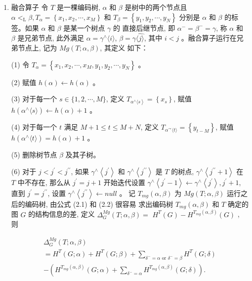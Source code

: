 \documentclass[a4paper]{apa6}
\begin{document}
\begin{enumerate}
\item 融合算子
\label{sec:orge7469f9}
令 \(T\) 是一棵编码树, \(\alpha\) 和 \(\beta\) 是树中的两个节点且 \(\alpha<_{\mathrm{L}} \beta, T_{\alpha}=\left\{x_{1}, x_{2}, \cdots, x_{M}\right\}\) 和 \(T_{\beta}=\left\{y_{1}, y_{2}, \cdots, y_{N}\right\}\) 分别是 \(\alpha\) 和 \(\beta\) 的标签。如果 \(\alpha\) 和 \(\beta\) 是某一个树点 \(\gamma\) 的 直接后继节点, 即 \(\alpha^{-}=\beta^{-}=\gamma\), 称 \(\alpha\) 和 \(\beta\) 是兄弟节点, 此外满足 \(\alpha=\gamma^{\wedge}\langle i\rangle\), \(\beta=\gamma \hat{\langle j\rangle}\), 其中 \(i<j\) 。融合算子运行在兄弟节点上, 记为 \(M g(T ; \alpha, \beta)\), 其定义 如下：

(1) 令 \(T_{\alpha}=\left\{x_{1}, x_{2}, \cdots, x_{M}, y_{1}, y_{2}, \cdots, y_{N}\right\}\) 。

(2) 赋值 \(h(\alpha) \leftarrow h(\alpha)\) 。

(3) 对于每一个 \(s \in\{1,2, \cdots, M\}\), 定义 \(T_{\left.\alpha^{\wedge} \langle s\right\rangle}=\left\{x_{s}\right\}\), 赋值 \(h\left(\alpha^{\wedge}\langle s\rangle\right) \leftarrow h(\alpha)+1\) 。

(4) 对于每一个 \(t\) 满足 \(M+1 \leq t \leq M+N\), 定义 \(T_{\alpha^{\curvearrowright}\langle t\rangle}=\left\{y_{t-M}\right\}\), 赋值 \(h\left(\alpha^{\wedge}\langle t\rangle\right)=h(\alpha)+1\) 。

(5) 删除树节点 \(\beta\) 及其子树。

(6) 对于 \(j<j^{\prime}<j^{\prime \prime}\), 如果 \(\gamma^{\wedge}\left\langle j^{\prime}\right\rangle\) 和 \(\gamma^{\wedge}\left\langle j^{\prime \prime}\right\rangle\) 是 \(T\) 的树点, \(\gamma^{\wedge}\left\langle j^{\prime \prime}+1\right\rangle\) 在 \(T\) 中不存在, 那么从 \(j^{\prime}=j+1\) 开始迭代设置 \(\gamma^{\wedge}\left\langle j^{\prime}-1\right\rangle \leftarrow \gamma^{\wedge}\left\langle j^{\prime}\right\rangle, j^{\prime}+1\), 直到 \(j^{\prime}=j^{\prime \prime}\), 设置 \(\gamma^{\wedge}\left\langle j^{\prime \prime}\right\rangle \leftarrow n u l l\) 。
记 \(T_{m g}(\alpha, \beta)\) 为 \(M g(T ; \alpha, \beta)\) 运行之后的编码树, 由公式 (2.1) 和 (2.2) 很容易 求出编码树 \(T_{m g}(\alpha, \beta)\) 和 \(T\) 确定的图 \(G\) 的结构信息的差, 定义 \(\Delta_{G}^{M g}(T ; \alpha, \beta)=\) \(H^{T}(G)-H^{T_{m g}(\alpha, \beta)}(G)\) , 则

$$\begin{array}{l}
\Delta_{G}^{M g}(T ; \alpha, \beta)\\=H^{T}(G ; \alpha)+H^{T}(G ; \beta)+\sum\limits_{\delta^{-}=\alpha \text { or } \delta^{-}=\beta} H^{T}(G ; \delta) \\
-\left(H^{T_{m g}(\alpha, \beta)}(G ; \alpha)+\sum\limits_{\delta^{-}=\alpha} H^{T_{m g}(\alpha, \beta)}(G ; \delta)\right) .
\end{array}$$


\end{enumerate}
\end{document}
